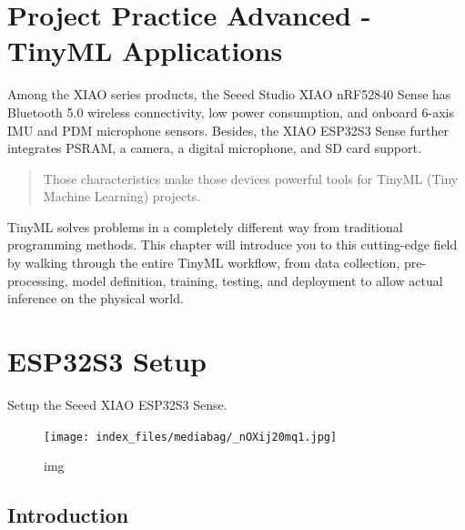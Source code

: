 \documentclass[
  letterpaper,
  DIV=11,
  numbers=noendperiod]{scrreprt}
\begin{document}

\hypertarget{project-practice-advanced---tinyml-applications}{%
\chapter{Project Practice Advanced - TinyML
Applications}\label{project-practice-advanced---tinyml-applications}}

Among the XIAO series products, the Seeed Studio XIAO nRF52840 Sense has
Bluetooth 5.0 wireless connectivity, low power consumption, and onboard
6-axis IMU and PDM microphone sensors. Besides, the XIAO ESP32S3 Sense
further integrates PSRAM, a camera, a digital microphone, and SD card
support.

\begin{quote}
Those characteristics make those devices powerful tools for TinyML (Tiny
Machine Learning) projects.
\end{quote}

TinyML solves problems in a completely different way from traditional
programming methods. This chapter will introduce you to this
cutting-edge field by walking through the entire TinyML workflow, from
data collection, pre-processing, model definition, training, testing,
and deployment to allow actual inference on the physical world.


\hypertarget{esp32s3-setup}{%
\chapter*{ESP32S3 Setup}\label{esp32s3-setup}}


Setup the Seeed XIAO ESP32S3 Sense.

\begin{figure}[H]

{\centering \texttt{[image: index\_files/mediabag/\_nOXij20mq1.jpg]}

}

\caption{img}

\end{figure}

\hypertarget{introduction-1}{%
\section*{Introduction}\label{introduction-1}}
\end{document}
